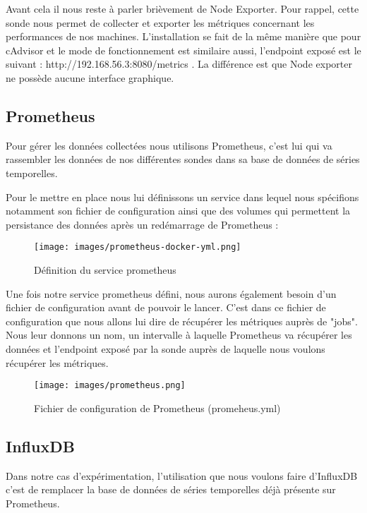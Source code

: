 \documentclass[oneside,12pt]{report}
\begin{document}
Avant cela il nous reste à parler brièvement de Node Exporter. Pour rappel, cette sonde nous permet de collecter et exporter les métriques concernant les performances de nos machines. L'installation se fait de la même manière que pour cAdvisor et le mode de fonctionnement est similaire aussi, l'endpoint exposé est le suivant : http://192.168.56.3:8080/metrics . La différence est que Node exporter ne possède aucune interface graphique.

\subsection{Prometheus}

Pour gérer les données collectées nous utilisons Prometheus, c'est lui qui va rassembler les données de nos différentes sondes dans sa base de données de séries temporelles.\newline

Pour le mettre en place nous lui définissons un service dans lequel nous spécifions notamment son fichier de configuration ainsi que des volumes qui permettent la persistance des données après un redémarrage de Prometheus :

\begin{figure}[H]
    \centering
    \texttt{[image: images/prometheus-docker-yml.png]}
    \caption{Définition du service prometheus}
    \label{fig:mesh1}
\end{figure}

Une fois notre service prometheus défini, nous aurons également besoin d'un fichier de configuration avant de pouvoir le lancer. C'est dans ce fichier de configuration que nous allons lui dire de récupérer les métriques auprès de "jobs". Nous leur donnons un nom, un intervalle à laquelle Prometheus va récupérer les données et l'endpoint exposé par la sonde auprès de laquelle nous voulons récupérer les métriques. 

\begin{figure}[H]
    \centering
    \texttt{[image: images/prometheus.png]}
    \caption{Fichier de configuration de Prometheus (promeheus.yml)}
    \label{fig:mesh1}
\end{figure}

\subsection{InfluxDB}

Dans notre cas d'expérimentation, l'utilisation que nous voulons faire d'InfluxDB c'est de remplacer la base de données de séries temporelles déjà présente sur Prometheus. \newline
\end{document}

